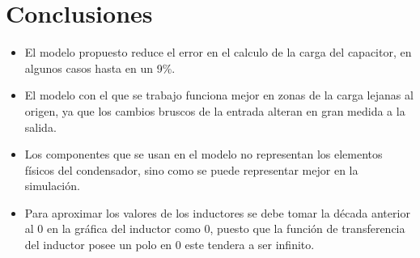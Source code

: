 \documentclass[journal]{IEEEtran}
\begin{document}
\section{Conclusiones}
\begin{itemize}
	\item El modelo propuesto reduce el error en el calculo de la carga del capacitor, en algunos casos hasta en un 9\%.
	\item El modelo con el que se trabajo funciona mejor en zonas de la carga lejanas al origen, ya que los cambios bruscos de la entrada alteran en gran medida a la salida.
	\item Los componentes que se usan en el modelo no representan los elementos físicos del condensador, sino como se puede representar mejor en la simulación.
	\item Para aproximar los valores de los inductores se debe tomar la década anterior al 0 en la gráfica del inductor como 0, puesto que la función de transferencia del inductor posee un polo en 0 este tendera a ser infinito.
\end{itemize}


%
%
\appendices
\end{document}
